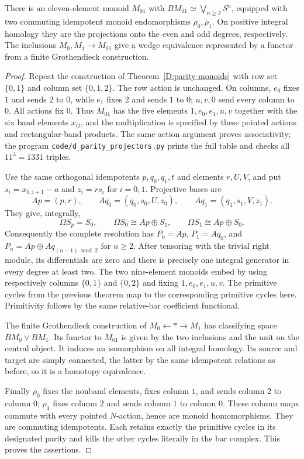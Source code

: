 \begin{proposition}
\label{D:parity-projectors}
There is an eleven-element monoid $M_{01}$ with
$BM_{01}\simeq\bigvee_{n\geq2}S^n$, equipped with two commuting
idempotent monoid endomorphisms $\rho_0,\rho_1$.  On positive
integral homology they are the projections onto the even and odd
degrees, respectively.  The inclusions $M_0,M_1\to M_{01}$ give
a wedge equivalence represented by a functor from a finite
Grothendieck construction.
\end{proposition}
\begin{proof}
Repeat the construction of Theorem~\ref{D:parity-monoids} with
row set $\{0,1\}$ and column set $\{0,1,2\}$.
The row action is unchanged.  On columns, $e_0$ fixes $1$ and
sends $2$ to $0$, while $e_1$ fixes $2$ and sends $1$ to $0$;
$u,v,0$ send every column to $0$.  All actions fix $0$.
Thus $M_{01}$ has the five elements $1,e_0,e_1,u,v$ together
with the six band elements $x_{ij}$, and the multiplication is
specified by these pointed actions and rectangular-band products.
The same action argument proves associativity; the program
\texttt{code/d\_parity\_projectors.py} prints the full table and
checks all $11^3=1331$ triples.

Use the same orthogonal idempotents $p,q_0,q_1,t$ and elements
$r,U,V$, and put
$s_i=x_{0,i+1}-a$ and $z_i=r s_i$ for $i=0,1$.
Projective bases are
\[
 Ap=(p,r),\qquad Aq_0=(q_0,s_0,U,z_0),\qquad
 Aq_1=(q_1,s_1,V,z_1).
\]
They give, integrally,
\[
 \Omega S_p=S_0,\qquad
 \Omega S_0\cong Ap\oplus S_1,\qquad
 \Omega S_1\cong Ap\oplus S_0.
\]
Consequently the complete resolution has $P_0=Ap$, $P_1=Aq_0$,
and $P_n=Ap\oplus Aq_{(n-1)\bmod2}$ for $n\geq2$.
After tensoring with the trivial right module, its differentials
are zero and there is precisely one integral generator in every
degree at least two.  The two nine-element monoids embed by using
respectively columns $\{0,1\}$ and $\{0,2\}$ and fixing
$1,e_0,e_1,u,v$.  The primitive cycles from the previous theorem
map to the corresponding primitive cycles here.  Primitivity
follows by the same relative-bar coefficient functional.

The finite Grothendieck construction of
$M_0\leftarrow *\to M_1$ has classifying space
$BM_0\vee BM_1$.  Its functor to $M_{01}$ is given by the two
inclusions and the unit on the central object.  It induces an
isomorphism on all integral homology.  Its source and target are
simply connected, the latter by the same idempotent relations
as before, so it is a homotopy equivalence.

Finally $\rho_0$ fixes the nonband elements, fixes column $1$,
and sends column $2$ to column $0$; $\rho_1$ fixes column $2$
and sends column $1$ to column $0$.  These column maps commute
with every pointed $N$-action, hence are monoid homomorphisms.
They are commuting idempotents.  Each retains exactly the primitive
cycles in its designated parity and kills the other cycles
literally in the bar complex.  This proves the assertions.
\end{proof}

